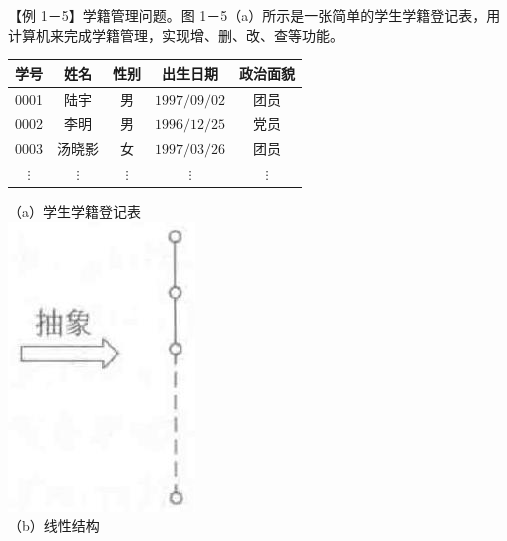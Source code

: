 \documentclass[10pt]{article}
\begin{document}
【例 1－5】学籍管理问题。图 1－5（a）所示是一张简单的学生学籍登记表，用计算机来完成学籍管理，实现增、删、改、查等功能。

\begin{center}
\begin{tabular}{|c|c|c|c|c|}
\hline
学号 & 姓名 & 性别 & 出生日期 & 政治面貌 \\
\hline
0001 & 陆宇 & 男 & $1997 / 09 / 02$ & 团员 \\
\hline
0002 & 李明 & 男 & $1996 / 12 / 25$ & 党员 \\
\hline
0003 & 汤晓影 & 女 & $1997 / 03 / 26$ & 团员 \\
\hline
$\vdots$ & $\vdots$ & $\vdots$ & $\vdots$ & $\vdots$ \\
\hline
\end{tabular}
\end{center}

（a）学生学籍登记表\\
\includegraphics[max width=\textwidth, center]{2025_06_06_704745ea57b15b2333e5g-020(1)}\\
（b）线性结构
\end{document}
